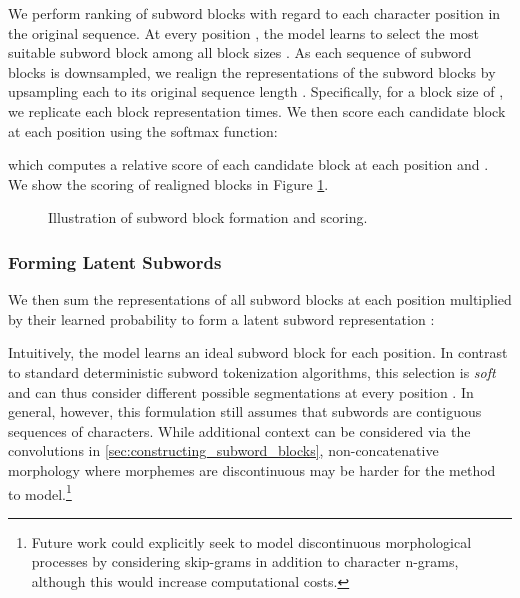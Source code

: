 \documentclass{article} \usepackage{iclr2022_conference,times}
\begin{document}
We perform ranking of subword blocks with regard to each character position in the original sequence. At every position , the model learns to select the most suitable subword block  among all block sizes . As each sequence of subword blocks  is downsampled, we realign the representations of the subword blocks by upsampling each  to its original sequence length . Specifically, for a block size of , we replicate each block representation   times. We then score each candidate block at each position  using the softmax function:

which computes a relative score of each candidate block at each position and .  We show the scoring of realigned blocks in Figure \ref{fig:subword_blocks}.

\begin{figure}[t]
  \hfill
  \hfill
  \caption{Illustration of subword block formation and scoring.}
  \label{fig:subword_blocks}
\end{figure}

\subsubsection{Forming Latent Subwords} \label{sec:latent_subwords}

We then sum the representations of all subword blocks  at each position  multiplied by their learned probability  to form a latent subword representation :

Intuitively, the model learns an ideal subword block for each position. In contrast to standard deterministic subword tokenization algorithms, this selection is \emph{soft} and can thus consider different possible segmentations at every position . In general, however, this formulation still assumes that subwords are contiguous sequences of characters. While additional context can be considered via the convolutions in \textsection \ref{sec:constructing_subword_blocks}, non-concatenative morphology where morphemes are discontinuous may be harder for the method to model.\footnote{Future work could explicitly seek to model discontinuous morphological processes by considering skip-grams in addition to character n-grams, although this would increase computational costs.}
\end{document}
